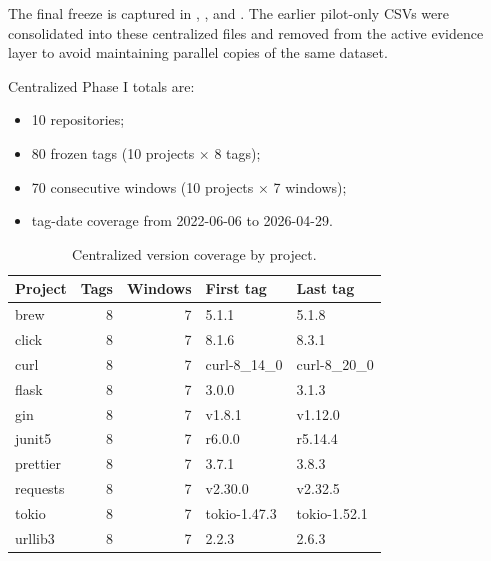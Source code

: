 The final freeze is captured in , ,
and . The earlier pilot-only CSVs were consolidated into these centralized
files and removed from the active evidence layer to avoid maintaining parallel copies of the same dataset.

Centralized Phase I totals are:
\begin{itemize}[leftmargin=*]
  \item 10 repositories;
  \item 80 frozen tags (10 projects $\times$ 8 tags);
  \item 70 consecutive windows (10 projects $\times$ 7 windows);
  \item tag-date coverage from 2022-06-06 to 2026-04-29.
\end{itemize}

\begin{table}[H]
\centering
\scriptsize
\renewcommand{\arraystretch}{1.12}
\begin{tabular}{lrrll}
\toprule
\textbf{Project} & \textbf{Tags} & \textbf{Windows} & \textbf{First tag} & \textbf{Last tag} \\
\midrule
brew     & 8 & 7 & 5.1.1        & 5.1.8 \\
click    & 8 & 7 & 8.1.6        & 8.3.1 \\
curl     & 8 & 7 & curl-8\_14\_0  & curl-8\_20\_0 \\
flask    & 8 & 7 & 3.0.0        & 3.1.3 \\
gin      & 8 & 7 & v1.8.1       & v1.12.0 \\
junit5   & 8 & 7 & r6.0.0       & r5.14.4 \\
prettier & 8 & 7 & 3.7.1        & 3.8.3 \\
requests & 8 & 7 & v2.30.0      & v2.32.5 \\
tokio    & 8 & 7 & tokio-1.47.3 & tokio-1.52.1 \\
urllib3  & 8 & 7 & 2.2.3        & 2.6.3 \\
\bottomrule
\end{tabular}
\caption{Centralized version coverage by project.}
\label{tab:round1_version_coverage}
\end{table}


